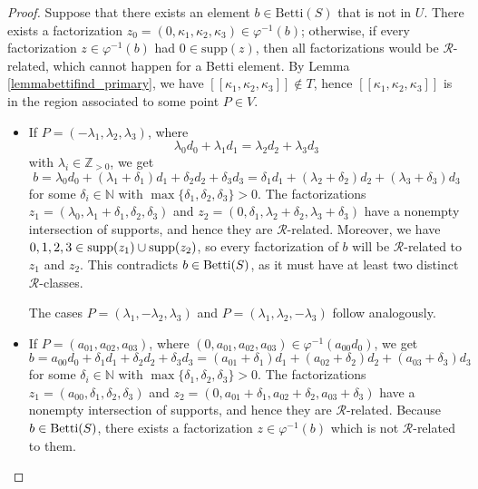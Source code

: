 \documentclass[12pt]{article}
\theoremstyle{remark}
\begin{document}
\begin{proof}
    Suppose that there exists an element $b \in \text{Betti}(S)$ that is not in $U$.
    There exists a factorization $z_0 =(0,\kappa_1,\kappa_2,\kappa_3) \in \varphi^{-1}(b)$; otherwise, if every factorization $z \in \varphi^{-1}(b)$ had $0 \in \text{supp}(z)$, then all factorizations would be $\mathcal{R}$-related, which cannot happen for a Betti element. By Lemma \ref{lemmabettifind_primary}, we have $[[\kappa_1,\kappa_2,\kappa_3]] \notin T$, hence $[[\kappa_1,\kappa_2,\kappa_3]]$ is in the region associated to some point $P \in V$.

    \begin{itemize}

    

    \item  If $P =(-\lambda_1,\lambda_2,\lambda_3)$, where
    \begin{equation}\label{betticharacter_eq1}
        \lambda_0d_0 + \lambda_1d_1 = \lambda_2d_2 + \lambda_3d_3
    \end{equation}
    with $\lambda_i \in \mathbb{Z}_{>0}$, we get
     \begin{equation}
        b =\lambda_0d_0 + (\lambda_1+\delta_1)d_1 + \delta_2d_2 + \delta_3d_3  =  \delta_1d_1 + (\lambda_2+\delta_2)d_2 + (\lambda_3+\delta_3)d_3
    \end{equation}
    for some $\delta_i \in \mathbb{N}$ with $\max \{\delta_1,\delta_2,\delta_3\} > 0$. The factorizations $z_1 =(\lambda_0,\lambda_1+\delta_1,\delta_2,\delta_3)$ and $z_2 =(0, \delta_1,\lambda_2+\delta_2,\lambda_3+\delta_3)$ have a nonempty intersection of supports, and hence they are $\mathcal{R}$-related. Moreover, we have $0,1,2,3 \in \textup{supp}(z_1) \cup \textup{supp}(z_2)$, so every factorization of $b$ will be $\mathcal{R}$-related to $z_1$ and $z_2$. This contradicts $b \in \textup{Betti}(S)$, as it must have at least two distinct $\mathcal{R}$-classes. 
    
    The cases $P=(\lambda_1,-\lambda_2,\lambda_3)$ and $P=(\lambda_1,\lambda_2,-\lambda_3)$ follow analogously.
    
    \item If $P =(a_{01},a_{02},a_{03})$, where $(0,a_{01},a_{02},a_{03}) \in \varphi^{-1}(a_{00}d_0)$, we get
     \begin{equation}
        b =a_{00}d_0 + \delta_1d_1 + \delta_2d_2 + \delta_3d_3  =  (a_{01}+\delta_1)d_1 + (a_{02}+\delta_2)d_2 + (a_{03}+\delta_3)d_3
    \end{equation}
    for some $\delta_i \in \mathbb{N}$ with $\max \{\delta_1,\delta_2,\delta_3\} > 0$. The factorizations $z_1 =(a_{00},\delta_1,\delta_2,\delta_3)$ and $z_2 =(0,a_{01}+\delta_1,a_{02}+\delta_2,a_{03}+\delta_3)$ have a nonempty intersection of supports, and hence they are $\mathcal{R}$-related. Because $b \in \textup{Betti}(S)$, there exists a factorization $z \in \varphi^{-1}(b)$ which is not $\mathcal{R}$-related to them. 
    

\end{itemize}
\end{proof}
\end{document}
